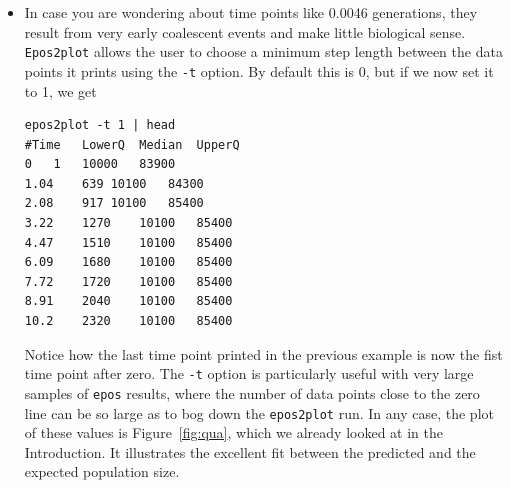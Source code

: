 \documentclass[a4paper]{article}
\newcommand{\ty}{\texttt}
\begin{document}
\begin{itemize}
\item In case you are wondering about time points like 0.0046
  generations, they result from very early coalescent events and make
  little biological sense. \ty{Epos2plot} allows the user to choose a
  minimum step length between the data points it prints using the
  \ty{-t} option. By default this is 0, but if we now set it to 1, we
  get
\begin{verbatim}
epos2plot -t 1 | head
#Time	LowerQ	Median	UpperQ
0	1	10000	83900
1.04	639	10100	84300
2.08	917	10100	85400
3.22	1270	10100	85400
4.47	1510	10100	85400
6.09	1680	10100	85400
7.72	1720	10100	85400
8.91	2040	10100	85400
10.2	2320	10100	85400
\end{verbatim}
Notice how the last time point printed in the previous example is now
the fist time point after zero. The \ty{-t} option is particularly
useful with very large samples of \ty{epos} results, where the number
of data points close to the zero line can be so large as to bog down
the \ty{epos2plot} run.  In any case, the plot of these values is
Figure~\ref{fig:qua}, which we already looked at in the
Introduction. It illustrates the excellent fit between the predicted
and the expected population size.
\end{itemize}


\end{document}
